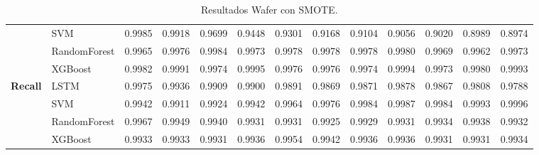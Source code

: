 \begin{table}[h]
\begin{adjustbox}{max width=15cm}
\begin{tabular}{|c|l|r|r|r|r|r|r|r|r|r|r|r|}
			& SVM &  0.9985 &  0.9918 &  0.9699 &  0.9448 &  0.9301 &  0.9168 &  0.9104 &  0.9056 &  0.9020 &  0.8989 &  0.8974 \\
			& RandomForest &  0.9965 &  0.9976 &  0.9984 &  0.9973 &  0.9978 &  0.9978 &  0.9978 &  0.9980 &  0.9969 &  0.9962 &  0.9973 \\
			& XGBoost &  0.9982 &  0.9991 &  0.9974 &  0.9995 &  0.9976 &  0.9976 &  0.9974 &  0.9994 &  0.9973 &  0.9980 &  0.9993 \\
			\hline
			\textbf{Recall} & LSTM &  0.9975 &  0.9936 &  0.9909 &  0.9900 &  0.9891 &  0.9869 &  0.9871 &  0.9878 &  0.9867 &  0.9808 &  0.9788 \\
			& SVM &  0.9942 &  0.9911 &  0.9924 &  0.9942 &  0.9964 &  0.9976 &  0.9984 &  0.9987 &  0.9984 &  0.9993 &  0.9996 \\
			& RandomForest &  0.9967 &  0.9949 &  0.9940 &  0.9931 &  0.9931 &  0.9925 &  0.9929 &  0.9931 &  0.9934 &  0.9938 &  0.9932 \\
			& XGBoost &  0.9933 &  0.9933 &  0.9931 &  0.9936 &  0.9954 &  0.9942 &  0.9936 &  0.9936 &  0.9931 &  0.9931 &  0.9934 \\
			\hline
		\end{tabular}
	\end{adjustbox}
	\caption{Resultados Wafer con SMOTE.}
	\label{tab:Wafer_SMOTE}
\end{table}
\newpage
